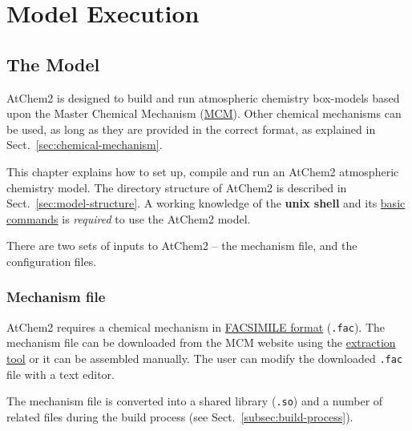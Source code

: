 %
%
%
%

\chapter{Model Execution} \label{ch:execution}

\section{The Model} \label{sec:model}

AtChem2 is designed to build and run atmospheric chemistry box-models
based upon the Master Chemical Mechanism (\href{http://mcm.leeds.ac.uk/MCM/}{MCM}).
Other chemical mechanisms can be used, as long as they are provided in
the correct format, as explained in Sect.~\ref{sec:chemical-mechanism}.

This chapter explains how to set up, compile and run an AtChem2
atmospheric chemistry model. The directory structure of AtChem2 is
described in Sect.~\ref{sec:model-structure}.
A working knowledge of the \textbf{unix shell} and its
\href{https://swcarpentry.github.io/shell-novice/reference/}{basic commands}
is \emph{required} to use the AtChem2 model.

There are two sets of inputs to AtChem2 -- the mechanism file, and the
configuration files.

\subsection{Mechanism file} \label{subsec:mechanism-file}

AtChem2 requires a chemical mechanism in
\hyperref[subsec:facsimile-format]{FACSIMILE format} (\texttt{.fac}).
The mechanism file can be downloaded from the MCM website
 using the \href{http://mcm.leeds.ac.uk/MCM/extract.htt}{extraction tool}
or it can be assembled manually. The user can modify the downloaded
\texttt{.fac} file with a text editor.

The mechanism file is converted into a shared library (\texttt{.so})
and a number of related files during the build process (see
Sect.~\ref{subsec:build-process}).

